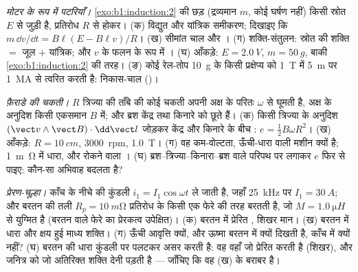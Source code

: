 \begin{exercise}[$\star\star\star$]\label{exo:b1:induction:10}
\emph{मोटर के रूप में पटरियाँ।} \cref{exo:b1:induction:2} की छड़ (द्रव्यमान $m$,
कोई घर्षण नहीं) किसी स्रोत $E$ से जुड़ी है, प्रतिरोध $R$ से होकर।
(क) विद्युत और यांत्रिक समीकरण; दिखाइए कि $m\,\dd v/\dd t = B\ell(E -
B\ell v)/R$। (ख) सीमांत चाल और । (ग) शक्ति-संतुलन:
स्रोत की शक्ति $=$ जूल $+$ यांत्रिक; और $v$ के फलन के रूप में ।
(घ) आँकड़े: $E = \qty{2.0}{V}$, $m = \qty{50}{g}$, बाकी
\cref{exo:b1:induction:2} की तरह। (ङ) कोई रेल-तोप \qty{10}{g} के किसी
प्रक्षेप्य को \qty{1}{T} में \qty{5}{m} पर \qty{1}{MA} से त्वरित करती है:
निकास-चाल ()।
\end{exercise}

\begin{exercise}[$\star\star\star$]\label{exo:b1:induction:11}
\emph{फ़ैराडे की चकती।} $R$ त्रिज्या की ताँबे की कोई चकती अपनी अक्ष के परितः
$\omega$ से घूमती है, अक्ष के अनुदिश किसी एकसमान $B$ में; और ब्रश केंद्र तथा
किनारे को छूते हैं। (क) किसी त्रिज्या के अनुदिश $(\vect v\wedge
\vect B)\cdot\dd\vect l$ जोड़कर केंद्र और किनारे के बीच : $e = \tfrac12B\omega R^2$।
(ख) आँकड़े: $R = \qty{10}{cm}$, \qty{3000}{rpm}, \qty{1.0}{T}। (ग) वह
कम-वोल्टता, ऊँची-धारा वाली मशीन क्यों है; \qty{1}{m\ohm} में धारा, और
रोकने वाला । (घ) ब्रश--त्रिज्या--किनारा--ब्रश वाले परिपथ पर  लगाकर $e$ फिर से पाइए: कौन-सा अभिवाह बदलता है?
\end{exercise}

\begin{exercise}[$\star\star\star$]\label{exo:b1:induction:12}
\emph{प्रेरण-चूल्हा।} काँच के नीचे की कुंडली $i_1 =
I_1\cos\omega t$ ले जाती है, जहाँ \qty{25}{kHz} पर $I_1 = \qty{30}{A}$; और
बरतन की तली $R_p = \qty{10}{m\ohm}$ प्रतिरोध के किसी एक फेरे की तरह बरतती
है, जो $M = \qty{1.0}{\micro H}$ से युग्मित है (बरतन वाले फेरे का प्रेरकत्व
उपेक्षित)। (क) बरतन में प्रेरित , शिखर मान। (ख) बरतन में
धारा और क्षय हुई माध्य शक्ति। (ग) ऊँची आवृत्ति क्यों, और ऊष्मा बरतन में
क्यों दिखती है, काँच में क्यों नहीं? (घ) बरतन की धारा कुंडली पर पलटकर असर
करती है: वह वहाँ जो  प्रेरित करती है (शिखर), और जनित्र को जो
अतिरिक्त शक्ति देनी पड़ती है --- जाँचिए कि वह (ख) के बराबर है।
\end{exercise}

